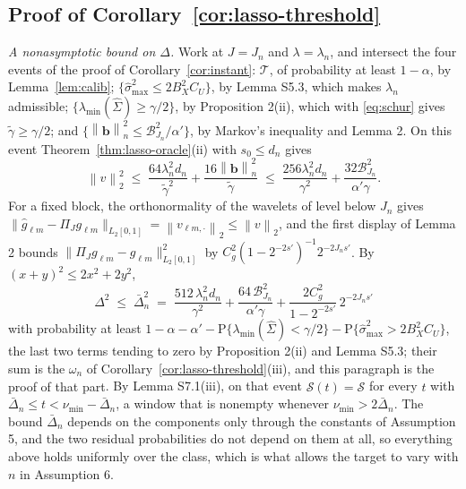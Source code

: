 \documentclass[10pt]{book}
\theoremstyle{definition}
\newcommand{\Prob}{\mathrm{P}}
\newcommand{\norm}[1]{\left\lVert #1 \right\rVert}
\newcommand{\normn}[1]{\left\lVert #1 \right\rVert_{n}}
\newcommand{\cv}{\ell}
\newcommand{\md}{m}
\newcommand{\gcomp}[2]{g_{#1#2}}
\newcommand{\PiJ}{\Pi_{J}}
\newcommand{\Gramhat}{\widehat{\Sigma}}
\newcommand{\pen}{\lambda}
\newcommand{\penn}{\lambda_{n}}
\newcommand{\seff}{s'}
\newcommand{\bb}{\mathbf{b}}
\newcommand{\smax}{\widehat{\sigma}_{\max}}
\newcommand{\gtil}{\widetilde{\gamma}}
\newcommand{\lmin}{\lambda_{\min}}
\begin{document}
{\subsection*{Proof of Corollary~\ref{cor:lasso-threshold}}

\emph{A nonasymptotic bound on $\Delta$.} Work at $J = J_n$ and $\pen = \penn$,
and intersect the four events of the proof of Corollary~\ref{cor:instant}: $\mathcal{T}$,
of probability at least $1-\alpha$, by Lemma~\ref{lem:calib};
$\{\smax^2 \le 2B_X^2C_U\}$, by Lemma S5.3, which makes $\penn$ admissible;
$\{\lmin(\Gramhat) \ge \gamma/2\}$, by Proposition 2(ii), which with
\eqref{eq:schur} gives $\gtil \ge \gamma/2$; and
$\{\normn{\bb}^2 \le \mathcal{B}^2_{J_n}/\alpha'\}$, by Markov's inequality and
Lemma 2. On this event Theorem~\ref{thm:lasso-oracle}(ii) with $s_0 \le d_n$ gives
\[
  \norm{v}_2^2 \;\le\; \frac{64\penn^2d_n}{\gtil^2}
  + \frac{16\normn{\bb}^2}{\gtil}
  \;\le\; \frac{256\penn^2d_n}{\gamma^2}
  + \frac{32\mathcal{B}^2_{J_n}}{\alpha'\gamma} .
\]
For a fixed block, the orthonormality of the wavelets of level below $J_n$
gives $\lVert\widehat{g}_{\cv\md} - \PiJ\gcomp{\cv}{\md}\rVert_{L_2[0,1]} =
\norm{v_{\cv\md,\cdot}}_2 \le \norm{v}_2$, and the first display of Lemma 2
bounds $\lVert\PiJ\gcomp{\cv}{\md} - \gcomp{\cv}{\md}\rVert^2_{L_2[0,1]}$ by
$C_g^2(1-2^{-2\seff})^{-1}2^{-2J_n\seff}$. By $(x+y)^2 \le 2x^2 + 2y^2$,
\begin{equation}
  \label{eq:Dn}
  \Delta^2 \;\le\; \bar{\Delta}_n^2 \;=\; \frac{512\,\penn^2d_n}{\gamma^2}
  + \frac{64\,\mathcal{B}^2_{J_n}}{\alpha'\gamma}
  + \frac{2C_g^2}{1-2^{-2\seff}}\,2^{-2J_n\seff}
\end{equation}
with probability at least
$1 - \alpha - \alpha' - \Prob\{\lmin(\Gramhat) < \gamma/2\} -
\Prob\{\smax^2 > 2B_X^2C_U\}$, the last two terms tending to zero by
Proposition 2(ii) and Lemma S5.3\textcolor{colR1}{; their sum is the
$\omega_n$ of Corollary~\ref{cor:lasso-threshold}(iii), and this paragraph is the proof of that
part}. By Lemma S7.1(iii), on that event
$\widehat{\mathcal{S}}(t) = \mathcal{S}$ for every $t$ with $\bar{\Delta}_n \le t < \nu_{\min} - \bar{\Delta}_n$, a window
that is nonempty whenever $\nu_{\min} > 2\bar{\Delta}_n$. The bound $\bar{\Delta}_n$ depends on the
components only through the constants of Assumption 5, and the two residual
probabilities do not depend on them at all, so everything above holds
uniformly over the class, which is what allows the target to vary with $n$ in
Assumption 6.

}
\end{document}
